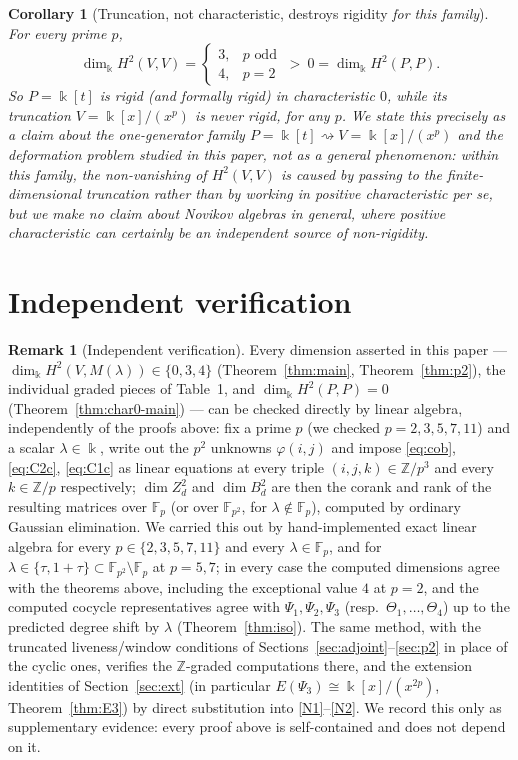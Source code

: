 \documentclass[11pt,reqno]{amsart}
\theoremstyle{plain}
\newtheorem{corollary}[theorem]{Corollary}
\theoremstyle{definition}
\newtheorem{remark}[theorem]{Remark}
\newcommand{\kk}{\Bbbk}
\newcommand{\Zt}{Z^2}
\newcommand{\Bt}{B^2}
\newcommand{\Ht}{H^2}
\newcommand{\Fp}{\mathbb{F}_p}
\newcommand{\Zp}{\mathbb{Z}/p}
\begin{document}
\begin{corollary}[Truncation, not characteristic, destroys rigidity \emph{for this family}]
\label{cor:trunc-destroys}
For every prime $p$,
\[
\dim_\kk\Ht(V,V)=\begin{cases}3,&p\text{ odd}\\4,&p=2\end{cases}\ >\ 0=\dim_\kk\Ht(P,P).
\]
So $P=\kk[t]$ is rigid (and formally rigid) in characteristic $0$, while its truncation
$V=\kk[x]/(x^p)$ is never rigid, for any $p$. We state this precisely as a claim about the
one-generator family $P=\kk[t]\rightsquigarrow V=\kk[x]/(x^p)$ and the deformation problem
studied in this paper, not as a general phenomenon: within this family, the non-vanishing of
$\Ht(V,V)$ is caused by passing to the finite-dimensional truncation rather than by working
in positive characteristic per se, but we make no claim about Novikov algebras in general,
where positive characteristic can certainly be an independent source of non-rigidity.
\end{corollary}

\section{Independent verification}\label{sec:verify}

\begin{remark}[Independent verification]\label{rem:verify}
Every dimension asserted in this paper --- $\dim_\kk\Ht(V,M(\lambda))\in\{0,3,4\}$
(Theorem~\ref{thm:main}, Theorem~\ref{thm:p2}), the individual graded pieces of Table~1, and
$\dim_\kk\Ht(P,P)=0$ (Theorem~\ref{thm:char0-main}) --- can be checked directly by linear
algebra, independently of the proofs above: fix a prime $p$ (we checked $p=2,3,5,7,11$) and a
scalar $\lambda\in\kk$, write out the $p^2$ unknowns $\varphi(i,j)$ and impose \eqref{eq:cob},
\eqref{eq:C2c}, \eqref{eq:C1c} as linear equations at every triple $(i,j,k)\in\Zp^3$ and every
$k\in\Zp$ respectively; $\dim\Zt_d$ and $\dim\Bt_d$ are then the corank and rank of the
resulting matrices over $\Fp$ (or over $\mathbb{F}_{p^2}$, for $\lambda\notin\Fp$), computed
by ordinary Gaussian elimination. We carried this out by hand-implemented exact linear algebra
for every $p\in\{2,3,5,7,11\}$ and every $\lambda\in\Fp$, and for $\lambda\in\{\tau,1+\tau\}
\subset\mathbb{F}_{p^2}\setminus\Fp$ at $p=5,7$; in every case the computed dimensions agree
with the theorems above, including the exceptional value $4$ at $p=2$, and the computed
cocycle representatives agree with $\Psi_1,\Psi_2,\Psi_3$ (resp.\ $\Theta_1,\dots,\Theta_4$)
up to the predicted degree shift by $\lambda$ (Theorem~\ref{thm:iso}). The same method, with
the truncated liveness/window conditions of Sections~\ref{sec:adjoint}--\ref{sec:p2} in place
of the cyclic ones, verifies the $\mathbb{Z}$-graded computations there, and the extension
identities of Section~\ref{sec:ext} (in particular $E(\Psi_3)\cong\kk[x]/(x^{2p})$,
Theorem~\ref{thm:E3}) by direct substitution into \eqref{N1}--\eqref{N2}. We record this only
as supplementary evidence: every proof above is self-contained and does not depend on it.
\end{remark}
\end{document}
